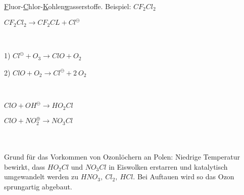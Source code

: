 \begin{definition}[FCKW]
	\underline{F}luor-\underline{C}hlor-\underline{K}ohlen\underline{w}asserstoffe. Beispiel: $CF_2Cl_2$
\end{definition}

\begin{definition}
	{\large
		$CF_2Cl_2 \rightarrow CF_2CL + Cl^\ominus$
	}
\end{definition}

\begin{definition}[Ozonabbaukreislauf]\leavevmode \\
	{\large
		1) $Cl^\ominus + O_3 \rightarrow ClO + O_2$	
		
		2) $ClO + O_2 \rightarrow Cl^\ominus + 2 \ O_2$
	}
\end{definition}

\begin{definition}\leavevmode \\
	{\large
		$ClO +  OH^\ominus \rightarrow HO_2Cl$
		
		$ClO + NO_2^\oplus \rightarrow NO_3Cl$	
	}
\end{definition}
\leavevmode \\ \\
Grund für das Vorkommen von Ozonlöchern an Polen: Niedrige Temperatur bewirkt, dass $HO_2Cl$ und $NO_3Cl$ in Eiswolken erstarren und katalytisch umgewandelt werden zu $HNO_3,\ Cl_2,\ HCl$. Bei Auftauen wird so das Ozon sprungartig abgebaut.